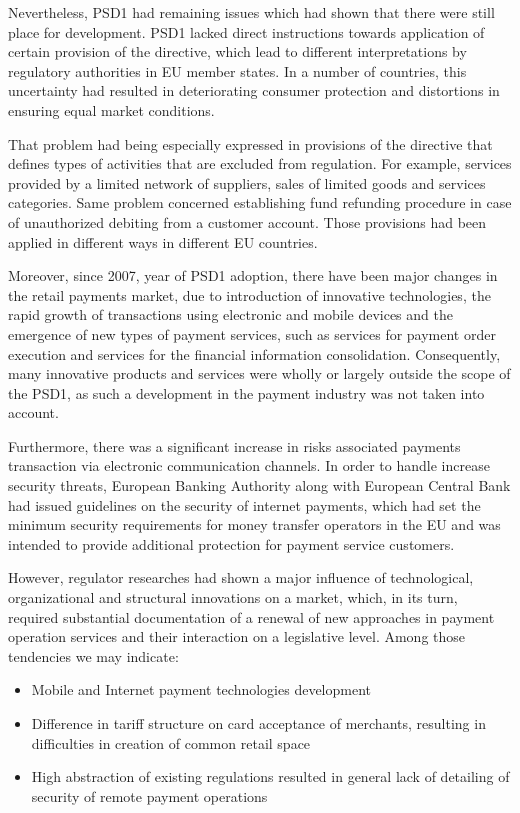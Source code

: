 Nevertheless, PSD1 had remaining issues which had shown that there were still place for development.
PSD1 lacked direct instructions towards application of certain provision of the directive, which lead to different interpretations by regulatory authorities in EU member states.
In a number of countries, this uncertainty had resulted in deteriorating consumer protection and distortions in ensuring equal market conditions. 

That problem had being especially expressed in provisions of the directive that defines types of activities that are excluded from regulation. 
For example, services provided by a limited network of suppliers, sales of limited goods and services categories.
Same problem concerned establishing fund refunding procedure in case of unauthorized debiting from a customer account.
Those provisions had been applied in different ways in different EU countries. 

Moreover, since 2007, year of PSD1 adoption, there have been major changes in the retail payments market, due to introduction of innovative technologies, the rapid growth of transactions using electronic and mobile devices and the emergence of new types of payment services, such as services for payment order execution and services for the financial information consolidation. 
Consequently, many innovative products and services were wholly or largely outside the scope of the PSD1, as such a development in the payment industry was not taken into account.

Furthermore, there was a significant increase in risks associated payments transaction via electronic communication channels.
In order to handle increase security threats, European Banking Authority along with European Central Bank had issued guidelines on the security of internet payments, which had set the minimum security requirements for money transfer operators in the EU and was intended to provide additional protection for payment service customers. 
\cite{guidelines_internet_payments}

However, regulator researches had shown a major influence of technological, organizational and structural innovations on a market, which, in its turn, required substantial documentation of a renewal of new approaches in payment operation services and their interaction on a legislative level.
Among those tendencies we may indicate:
\begin{itemize}
    \item Mobile and Internet payment technologies development
    \item Difference in tariff structure on card acceptance of merchants, resulting in difficulties in creation of common retail space
    \item High abstraction of existing regulations resulted in general lack of detailing of security of remote payment operations
\end{itemize}

